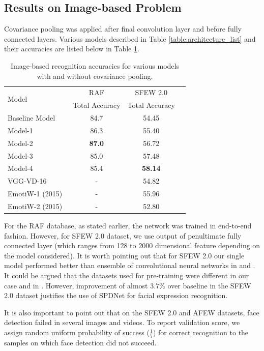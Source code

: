 \documentclass[10pt,twocolumn,letterpaper]{article}
\begin{document}
	\subsection{Results on Image-based Problem}
    Covariance pooling was applied after final convolution layer and before fully connected layers. Various models described in Table \ref{table:architecture_list} and their accuracies are listed below in Table \ref{table:modacc}.
		\begin{table}[ht]
			\centering
			\begin{tabular}{lccc}
				\toprule
				\multirow{2}{*}{Model}	&  RAF	& SFEW 2.0\\ 
				& Total Accuracy	& Total Accuracy \\
				\midrule
				Baseline Model ~\cite{dlpcnn}  & 84.7  			& 54.45 \\ 
				Model-1 				& 86.3  			& 55.40 \\
				Model-2 				& \textbf{87.0} 				& 56.72 \\
				Model-3 				& 85.0 				& 57.48 \\ 
				Model-4 				& 85.4 				& \textbf{58.14}\\
				\midrule
				\midrule
				VGG-VD-16~\cite{grimaces}				&  -					& 54.82\\
				EmotiW-1 (2015)~\cite{cmu}& -				& 55.96\\
				EmotiW-2 (2015)~\cite{committee}		& -					& 52.80\\
				\bottomrule
			\end{tabular}
			\caption{Image-based recognition accuracies for various models with and without covariance pooling.}
			\label{table:modacc}
		\end{table}
		For the RAF database, as stated earlier, the network was trained in end-to-end fashion. However, for SFEW 2.0 dataset, we use output of penultimate fully connected layer (which ranges from 128 to 2000 dimensional feature depending on the model considered). It is worth pointing out that for SFEW 2.0 our single model performed better than ensemble of convolutional neural networks in \cite{cmu} and \cite{committee}. It could be argued that the datasets used for pre-training were different in our case and in \cite{cmu}\cite{committee}. However, improvement of almost $3.7\%$ over baseline in the SFEW 2.0 dataset justifies the use of SPDNet for facial expression recognition.
		
		It is also important to point out that on the SFEW 2.0 and AFEW datasets, face detection failed in several images and videos. To report validation score, we assign random uniform probability of success ($\frac{1}{7}$) for correct recognition to the samples on which face detection did not succeed.
		
\end{document}
